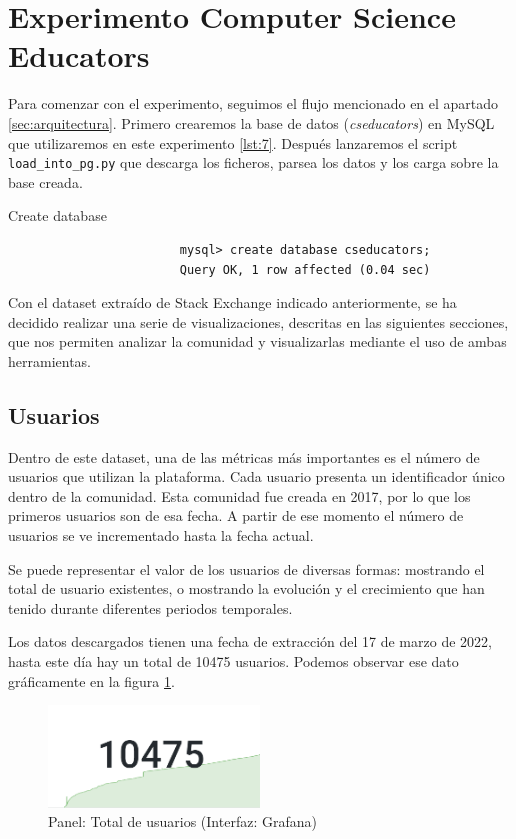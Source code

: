 \documentclass[a4paper, 12pt]{book}
\begin{document}
\section{Experimento Computer Science Educators}
\label{chap:exper_cseducators}

Para comenzar con el experimento, seguimos el flujo mencionado en el apartado \ref{sec:arquitectura}. 
Primero crearemos la base de datos (\emph{cseducators}) en MySQL que utilizaremos en este experimento \ref{lst:7}. Después lanzaremos el script \texttt{load\_into\_pg.py} que descarga los ficheros, parsea los datos y los carga sobre la base creada.
\begin{listing}[t]
    \caption{Create database}{}
    \label{lst:7}
    \begin{verbatim}
                        mysql> create database cseducators;
                        Query OK, 1 row affected (0.04 sec)
    \end{verbatim}
\end{listing}

Con el dataset extraído de Stack Exchange indicado anteriormente, se ha decidido realizar una serie de visualizaciones, descritas en las siguientes secciones, que nos permiten analizar la comunidad y visualizarlas mediante el uso de ambas herramientas. 


\subsection{Usuarios}
Dentro de este dataset, una de las métricas más importantes es el número de usuarios que utilizan la plataforma. Cada usuario presenta un identificador único dentro de la comunidad.  
Esta comunidad fue creada en 2017, por lo que los primeros usuarios son de esa fecha. A partir de ese momento el número de usuarios se ve incrementado hasta la fecha actual. 

Se puede representar el valor de los usuarios de diversas formas: mostrando el total de usuario existentes, o mostrando la evolución y el crecimiento que han tenido durante diferentes periodos temporales. 

Los datos descargados tienen una fecha de extracción del 17 de marzo de 2022, hasta este día hay un total de 10475 usuarios. Podemos observar ese dato gráficamente en la figura  \ref{figura:total_users}. 

\begin{figure}[ht]
    \centering
    \includegraphics[width=0.5\textwidth]{img/cse/Total_usuarios.png}
    \caption{Panel: Total de usuarios (Interfaz: Grafana)}
    \label{figura:total_users}
\end{figure}
\end{document}
